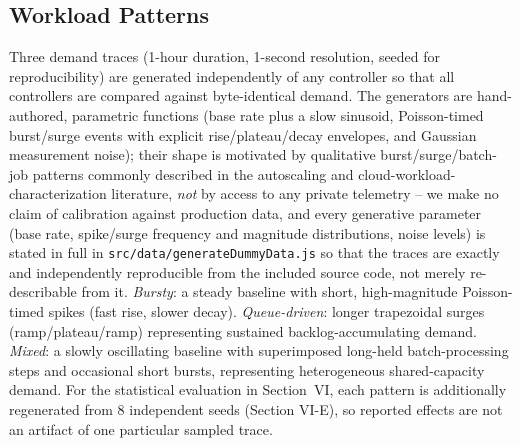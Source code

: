 \documentclass[conference]{IEEEtran}
\begin{document}
\subsection{Workload Patterns}
Three demand traces (1-hour duration, 1-second resolution, seeded for reproducibility) are generated
independently of any controller so that all controllers are compared against byte-identical demand.
The generators are hand-authored, parametric functions (base rate plus a slow sinusoid, Poisson-timed
burst/surge events with explicit rise/plateau/decay envelopes, and Gaussian measurement noise); their
shape is motivated by qualitative burst/surge/batch-job patterns commonly described in the autoscaling
and cloud-workload-characterization literature, \emph{not} by access to any private telemetry -- we
make no claim of calibration against production data, and every generative parameter (base rate,
spike/surge frequency and magnitude distributions, noise levels) is stated in full in
\texttt{src/data/generateDummyData.js} so that the traces are exactly and independently reproducible
from the included source code, not merely re-describable from it. \emph{Bursty}: a steady baseline with
short, high-magnitude Poisson-timed spikes (fast rise, slower decay). \emph{Queue-driven}: longer
trapezoidal surges (ramp/plateau/ramp) representing sustained backlog-accumulating demand.
\emph{Mixed}: a slowly oscillating baseline with superimposed long-held batch-processing steps and
occasional short bursts, representing heterogeneous shared-capacity demand. For the statistical
evaluation in Section~VI, each pattern is additionally regenerated from 8 independent seeds (Section
VI-E), so reported effects are not an artifact of one particular sampled trace.
\end{document}
